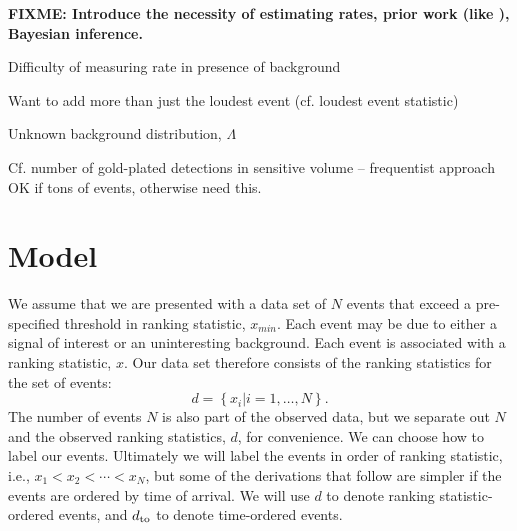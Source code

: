 \documentclass[aps,prd]{revtex4-1}
\newcommand{\fixme}[1]{\textbf{FIXME: #1}}
\newcommand{\mathset}[1]{\left\{ #1 \right\}}
\begin{document}
\fixme{Introduce the necessity of estimating rates, prior work (like
  \cite{Biswas2009}), Bayesian inference.}
  
Difficulty of measuring rate in presence of background

Want to add more than just the loudest event (cf. loudest event
statistic)

Unknown background distribution, $\Lambda$

Cf. number of gold-plated detections in sensitive volume --
frequentist approach OK if tons of events, otherwise need this.


\section{Model}

We assume that we are presented with a data set of $N$ events that exceed a pre-specified threshold in ranking statistic, $x_{min}$.  Each
event may be due to either a signal of interest or an uninteresting
background.  Each event is associated with a ranking statistic, $x$.
Our data set therefore consists of the ranking statistics for the set
of events:
\begin{equation}
  d = \mathset{ x_i | i = 1, \ldots, N } .
\end{equation}
The number of events $N$ is also part of the observed data, but we separate out $N$ and the observed ranking statistics, $d$, for convenience. We can choose how to label our events. Ultimately we will label the events in order of ranking statistic, i.e., $x_1 < x_2 < \cdots < x_N$, but some of the derivations that follow are simpler if the events are ordered by time of arrival. We will use $d$ to denote ranking statistic-ordered events, and $d_{\rm to}$ to denote time-ordered events.
\end{document}
